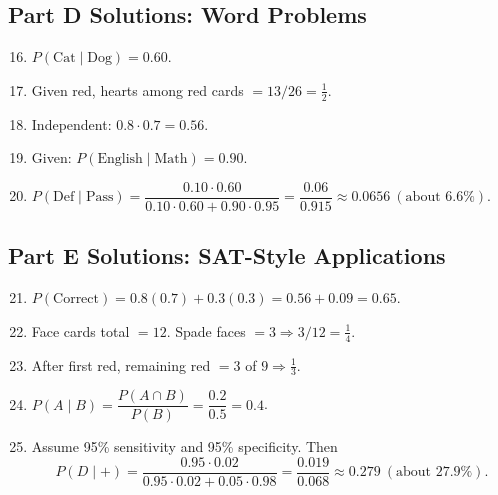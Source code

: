 \documentclass[14pt]{extarticle}
\begin{document}
\subsection*{Part D Solutions: Word Problems}
\begin{enumerate}
  \setcounter{enumi}{15}
  \item \(P(\text{Cat}\mid \text{Dog})=\boxed{0.60}\).
  \item Given red, hearts among red cards \(=13/26=\boxed{\tfrac{1}{2}}\).
  \item Independent: \(0.8\cdot0.7=\boxed{0.56}\).
  \item Given: \(P(\text{English}\mid \text{Math})=\boxed{0.90}\).
  \item \(P(\text{Def}\mid \text{Pass})=\dfrac{0.10\cdot0.60}{0.10\cdot0.60+0.90\cdot0.95}
  =\dfrac{0.06}{0.915}\approx\boxed{0.0656}\ (\text{about }6.6\%)\).
\end{enumerate}

\subsection*{Part E Solutions: SAT-Style Applications}
\begin{enumerate}
  \setcounter{enumi}{20}
  \item \(P(\text{Correct})=0.8(0.7)+0.3(0.3)=0.56+0.09=\boxed{0.65}\).
  \item Face cards total \(=12\). Spade faces \(=3\Rightarrow 3/12=\boxed{\tfrac{1}{4}}\).
  \item After first red, remaining red \(=3\) of \(9\Rightarrow \boxed{\tfrac{1}{3}}\).
  \item \(P(A\mid B)=\dfrac{P(A\cap B)}{P(B)}=\dfrac{0.2}{0.5}=\boxed{0.4}\).
  \item Assume 95\% sensitivity and 95\% specificity. Then
  \[
  P(D\mid +)=\frac{0.95\cdot0.02}{0.95\cdot0.02+0.05\cdot0.98}
  =\frac{0.019}{0.068}\approx\boxed{0.279}\ (\text{about }27.9\%).
  \]
\end{enumerate}





\end{document}
